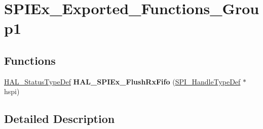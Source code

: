 \hypertarget{group___s_p_i_ex___exported___functions___group1}{}\section{S\+P\+I\+Ex\+\_\+\+Exported\+\_\+\+Functions\+\_\+\+Group1}
\label{group___s_p_i_ex___exported___functions___group1}
\subsection*{Functions}
\begin{DoxyCompactItemize}
\item 
\mbox{\label{group___s_p_i_ex___exported___functions___group1_ga4e633d926515bb05b8f6b6ce16ad1c1c}} 
\mbox{\hyperlink{stm32f7xx__hal__def_8h_a63c0679d1cb8b8c684fbb0632743478f}{H\+A\+L\+\_\+\+Status\+Type\+Def}} {\bfseries H\+A\+L\+\_\+\+S\+P\+I\+Ex\+\_\+\+Flush\+Rx\+Fifo} (\mbox{\hyperlink{group___s_p_i___exported___types_gab3bd115785297692c125528b7293566b}{S\+P\+I\+\_\+\+Handle\+Type\+Def}} $\ast$hspi)
\end{DoxyCompactItemize}


\subsection{Detailed Description}
